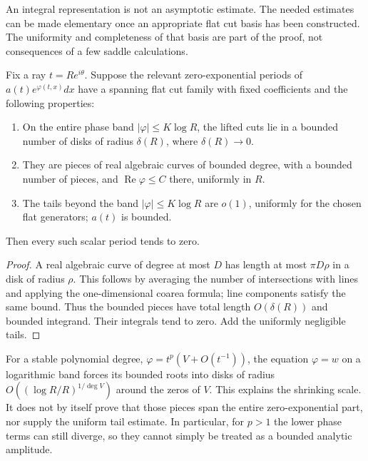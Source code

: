 An integral representation is not an asymptotic estimate. The needed
estimates can be made elementary once an appropriate flat cut basis
has been constructed. The uniformity and completeness of that basis
are part of the proof, not consequences of a few saddle calculations.

\begin{lemma}\label{lem:conditionalshrink}
Fix a ray $t=Re^{i\theta}$. Suppose the relevant zero-exponential
periods of $a(t)e^{\varphi(t,x)}dx$ have a spanning flat cut family
with fixed coefficients and the following properties:
\begin{enumerate}
\item On the entire phase band $|\varphi|\leq K\log R$, the lifted
cuts lie in a bounded number of disks of radius $\delta(R)$, where
$\delta(R)\to0$.
\item They are pieces of real algebraic curves of bounded degree,
with a bounded number of pieces, and $\operatorname{Re}\varphi\leq C$
there, uniformly in $R$.
\item The tails beyond the band $|\varphi|\leq K\log R$ are $o(1)$,
uniformly for the chosen flat generators; $a(t)$ is bounded.
\end{enumerate}
Then every such scalar period tends to zero.
\end{lemma}
\begin{proof}
A real algebraic curve of degree at most $D$ has length at most
$\pi D\rho$ in a disk of radius $\rho$. This follows by averaging
the number of intersections with lines and applying the one-dimensional
coarea formula; line components satisfy the same bound.
Thus the bounded pieces have total length $O(\delta(R))$ and bounded
integrand. Their integrals tend to zero. Add the uniformly negligible
tails.
\end{proof}

For a stable polynomial degree, $\varphi=t^p(V+O(t^{-1}))$, the
equation $\varphi=w$ on a logarithmic band forces its bounded roots
into disks of radius $O((\log R/R)^{1/\deg V})$ around the zeros of
$V$. This explains the shrinking scale. It does not by itself prove
that those pieces span the entire zero-exponential part, nor supply
the uniform tail estimate. In particular, for $p>1$ the lower phase
terms can still diverge, so they cannot simply be treated as a bounded
analytic amplitude.


